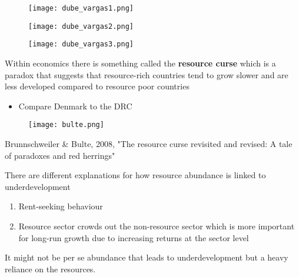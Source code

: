 \documentclass{beamer}
\begin{document}
\begin{frame}
  \begin{figure}
    \texttt{[image: dube\_vargas1.png]}
  \end{figure}
\end{frame}

\begin{frame}
  \begin{figure}
    \texttt{[image: dube\_vargas2.png]}
  \end{figure}
\end{frame}

\begin{frame}
  \begin{figure}
    \texttt{[image: dube\_vargas3.png]}
  \end{figure}
\end{frame}


\begin{frame}
 Within economics there is something called the \textbf{resource curse} which is a paradox that suggests that resource-rich countries tend to grow slower and are less developed compared to resource poor countries
 \begin{itemize}
   \item Compare Denmark to the DRC
 \end{itemize}
\end{frame}

\begin{frame}
  \begin{figure}
    \texttt{[image: bulte.png]}
  \end{figure}
  Brunnschweiler \& Bulte, 2008, "The resource curse revisited and revised: A tale of paradoxes and red herrings"
\end{frame}

\begin{frame}
 There are different explanations for how resource abundance is linked to underdevelopment
 \begin{enumerate}
  \item Rent-seeking behaviour
  \item Resource sector crowds out the non-resource sector which is more important for long-run growth due to increasing returns at the sector level
 \end{enumerate}
 \medskip
 It might not be per se abundance that leads to underdevelopment but a heavy reliance on the resources. 
\end{frame}
\end{document}
